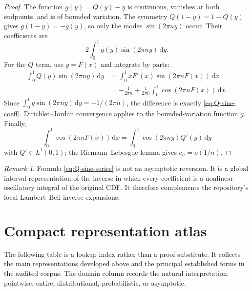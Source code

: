 \documentclass[11pt,oneside]{article}
\theoremstyle{definition}
\theoremstyle{remark}
\newtheorem{remark}[theorem]{Remark}
\newcommand{\dd}{\,\mathrm d}
\newcommand{\smallo}{o}
\begin{document}
\begin{proof}
The function $g(y)=Q(y)-y$ is continuous, vanishes at both endpoints, and is of bounded
variation.  The symmetry $Q(1-y)=1-Q(y)$ gives $g(1-y)=-g(y)$, so only the modes
$\sin(2\pi ny)$ occur.  Their coefficients are
\[
 2\int_0^1g(y)\sin(2\pi ny)\dd y.
\]
For the $Q$ term, use $y=F(x)$ and integrate by parts:
\begin{align*}
 \int_0^1Q(y)\sin(2\pi ny)\dd y
 &=\int_0^1xF'(x)\sin(2\pi nF(x))\dd x\\
 &=-\frac1{2\pi n}+\frac1{2\pi n}
   \int_0^1\cos(2\pi nF(x))\dd x.
\end{align*}
Since $\int_0^1y\sin(2\pi ny)\dd y=-1/(2\pi n)$, the difference is exactly
\eqref{eq:Q-sine-coeff}.  Dirichlet--Jordan convergence applies to the bounded-variation
function $g$.  Finally,
\[
 \int_0^1\cos(2\pi nF(x))\dd x
 =\int_0^1\cos(2\pi ny)Q'(y)\dd y
\]
with $Q'\in L^1(0,1)$; the Riemann--Lebesgue lemma gives $c_n=\smallo(1/n)$.
\end{proof}

\begin{remark}
Formula \eqref{eq:Q-sine-series} is not an asymptotic reversion.  It is a global interval
representation of the inverse in which every coefficient is a nonlinear oscillatory integral
of the original CDF.  It therefore complements the repository's local Lambert--Bell inverse
expansions.
\end{remark}

\section{Compact representation atlas}
\label{sec:atlas}

The following table is a lookup index rather than a proof substitute.  It collects the main
representations developed above and the principal established forms in the audited corpus.
The domain column records the natural interpretation: pointwise, entire, distributional,
probabilistic, or asymptotic.
\end{document}
